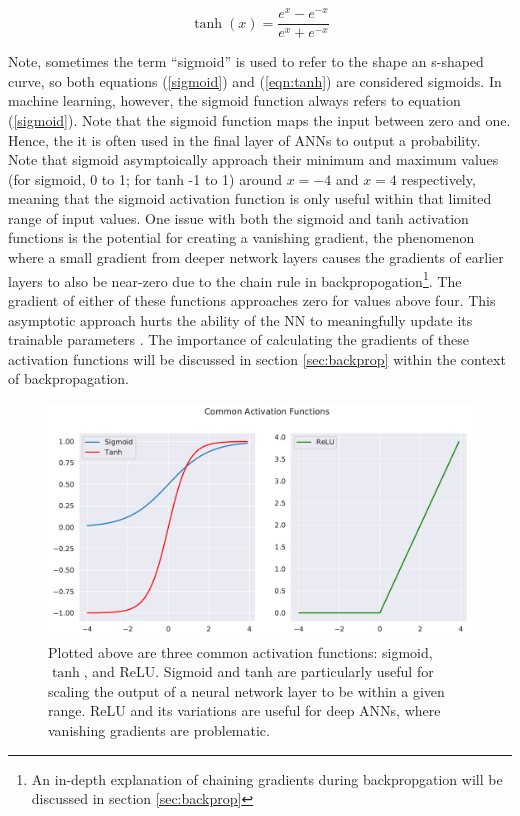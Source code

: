 \begin{equation}
    \label{eqn:tanh}
    \tanh(x) = \frac{e^x - e^{-x}}{e^x + e^{-x}} 
\end{equation}

\noindent Note, sometimes the term ``sigmoid'' is used to refer to the shape an s-shaped curve, so both equations (\ref{sigmoid}) and (\ref{eqn:tanh}) are considered sigmoids. In machine learning, however, the sigmoid function always refers to equation (\ref{sigmoid}). Note that the sigmoid function maps the input between zero and one. Hence, the it is often used in the final layer of ANNs to output a probability. Note that sigmoid asymptoically approach their minimum and maximum values (for sigmoid, 0 to 1; for tanh -1 to 1) around $ {x=-4} $ and $ {x=4} $ respectively, meaning that the sigmoid activation function is only useful within that limited range of input values. One issue with both the sigmoid and tanh activation functions is the potential for creating a vanishing gradient, the phenomenon where a small gradient from deeper network layers causes the gradients of earlier layers to also be near-zero due to the chain rule in backpropogation\footnote{An in-depth explanation of chaining gradients during backpropgation will be discussed in section \ref{sec:backprop}}. The gradient of either of these functions approaches zero for values above four. This asymptotic approach hurts the ability of the NN to meaningfully update its trainable parameters  \cite{nn-regularization}. The importance of calculating the gradients of these activation functions will be discussed in section \ref{sec:backprop} within the context of backpropagation. 

\begin{figure}[h!]
    \centering
    \includegraphics[width=\linewidth]{Chapters/Figures/sigmoids2.pdf}
    \caption[Common Activation Functions]{Plotted above are three common activation functions: sigmoid, $\tanh$, and ReLU. Sigmoid and tanh are particularly useful for scaling the output of a neural network layer to be within a given range. ReLU and its variations are useful for deep ANNs, where vanishing gradients are problematic.}
    \label{fig:ActivationFunctions}
\end{figure}

